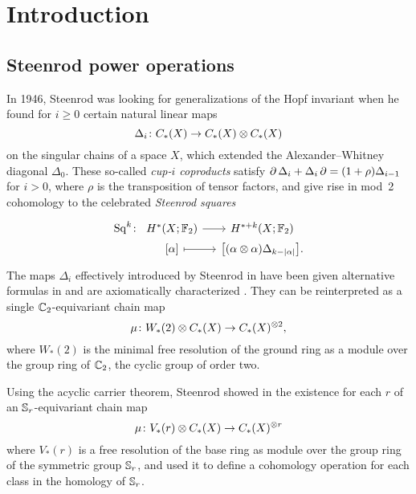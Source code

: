 
\section{Introduction}\label{s:introduction}

\subsection{Steenrod power operations}

In 1946, Steenrod was looking for generalizations of the Hopf invariant when he found for $i \geq 0$ certain natural linear maps
\[
\Delta_i \colon C_{*}(X) \to C_{*}(X) \otimes C_{*}(X)
\]
on the singular chains of a space $X$, which extended the Alexander--Whitney diagonal $\Delta_0$.
These so-called \textit{cup-$i$ coproducts} satisfy $\operatorname{\partial}\Delta_i + \Delta_i\operatorname{\partial} = (1+\rho)\Delta_{i-1}$ for $i > 0$, where $\rho$ is the transposition of tensor factors, and give rise in mod~2 cohomology to the celebrated \emph{Steenrod squares}
\begin{equation}\label{eq:intro Sq}
	\begin{tikzcd}[column sep=small, row sep=0]
		\Sq^{k} \colon &[-15pt] H^*(X;\mathbb{F}_2) \arrow[r] & H^{*+k}(X;\mathbb{F}_2) \\
		& {[\alpha]} \arrow[r, mapsto] & {\big[(\alpha \otimes \alpha)\Delta_{k-\bars{\alpha}}\big]}.
	\end{tikzcd}
\end{equation}
The maps $\Delta_i$ effectively introduced by Steenrod in \cite{steenrod1947products} have been given alternative formulas in \cite{real1996computability,medina2021fast_sq} and are axiomatically characterized \cite{medina2022axiomatic}.
They can be reinterpreted as a single $\mathbb{C}_2$-equivariant chain map
\[
\mu \colon W_*(2) \otimes C_{*}(X) \to C_{*}(X)^{\otimes 2},
\]
where $W_*(2)$ is the minimal free resolution of the ground ring as a module over the group ring of $\mathbb{C}_2$, the cyclic group of order two.

Using the acyclic carrier theorem, Steenrod showed in \cite{steenrod1952reduced} the existence for each $r$ of an $\mathbb{S}_r$-equivariant chain map
\[
\mu \colon V_\ast(r) \otimes C_{*}(X) \to C_{*}(X)^{\otimes r}
\]
where $V_\ast(r)$ is a free resolution of the base ring as module over the group ring of the symmetric group $\mathbb{S}_r$, and used it to define a cohomology operation for each class in the homology of $\mathbb{S}_r$.

